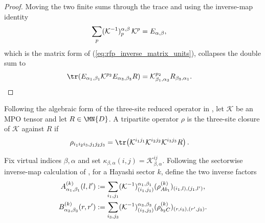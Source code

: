\begin{proof}\leanok
    Moving the two finite sums through the trace and using the inverse-map
    identity
    \begin{align}
        \sum_p(\mathcal K^{-1})^{\alpha,\beta}_p\,\mathcal K^p
         & =E_{\alpha,\beta},
        \notag
    \end{align}
    which is the matrix form of (\ref{eq:rfp_inverse_matrix_units}), collapses
    the double sum to
    \begin{align}
        \tr\!\left(E_{\alpha_1,\beta_1}\mathcal K^{p_2}
        E_{\alpha_3,\beta_3}R\right)
         & =\mathcal K^{p_2}_{\beta_1,\alpha_3}
        R_{\beta_3,\alpha_1}.
        \notag
    \end{align}
\end{proof}

\begin{definition}
    \label{def:mpdo_three_site_closure}
    \leanok
    Following the algebraic form of the three-site reduced operator in
    \cite[Appendix~C.2, lines~1422--1433]{Cirac2016MPDO_arXiv}, let
    $\mathcal K$ be an MPO tensor and let $R\in\MN{D}$. A tripartite operator
    $\rho$ is the three-site closure of $\mathcal K$ against $R$ if
    \begin{align}
        \rho_{i_1i_2i_3,j_1j_2j_3}
         & =\tr\!\left(\mathcal K^{i_1j_1}\mathcal K^{i_2j_2}
        \mathcal K^{i_3j_3}R\right).
        \label{eq:rfp_three_site_closure}
    \end{align}
\end{definition}

\begin{definition}
    \label{def:mpdo_hayashi_inverse_factors}
    \leanok
    Fix virtual indices $\beta,\alpha$ and set
    $\kappa_{\beta,\alpha}(i,j)=\mathcal K^{ij}_{\beta,\alpha}$.
    Following the sectorwise inverse-map calculation of
    \cite[Appendix~C.2, lines~1407--1428]{Cirac2016MPDO_arXiv}, for a Hayashi
    sector $k$, define the two inverse factors
    \begin{align}
        A^{(k)}_{\alpha_1,\beta_1}(l,l')
         & :=
        \sum_{i_1,j_1}
        (\mathcal K^{-1})^{\alpha_1,\beta_1}_{(i_1,j_1)}
        (\rho_{A b_1}^{(k)})_{(i_1,l),(j_1,l')},
        \notag \\
        B^{(k)}_{\alpha_3,\beta_3}(r,r')
         & :=
        \sum_{i_3,j_3}
        (\mathcal K^{-1})^{\alpha_3,\beta_3}_{(i_3,j_3)}
        (\rho_{b_2 C}^{(k)})_{(r,i_3),(r',j_3)}.
        \notag
    \end{align}
\end{definition}

